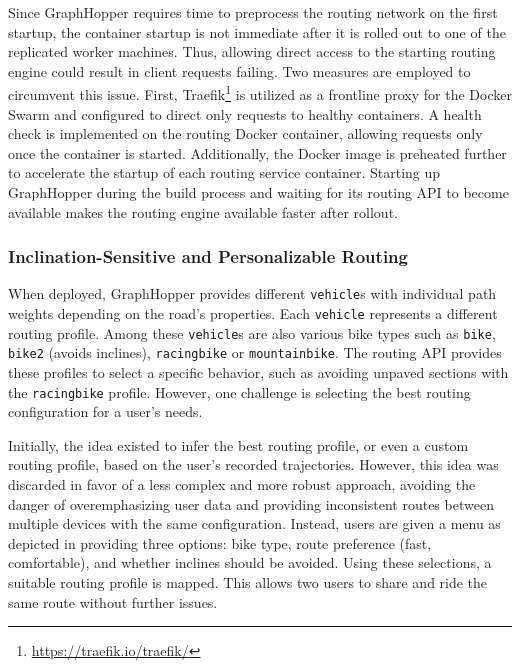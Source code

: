 Since GraphHopper requires time to preprocess the routing network on the first startup, the container startup is not immediate after it is rolled out to one of the replicated worker machines. Thus, allowing direct access to the starting routing engine could result in client requests failing. Two measures are employed to circumvent this issue. First, Traefik\footnote{\url{https://traefik.io/traefik/}} is utilized as a frontline proxy for the Docker Swarm and configured to direct only requests to healthy containers. A health check is implemented on the routing Docker container, allowing requests only once the container is started. Additionally, the Docker image is preheated further to accelerate the startup of each routing service container. Starting up GraphHopper during the build process and waiting for its routing API to become available makes the routing engine available faster after rollout. 

\subsubsection{Inclination-Sensitive and Personalizable Routing}\label{sec:maxlorenz3}

When deployed, GraphHopper provides different \texttt{vehicle}s with individual path weights depending on the road's properties. Each \texttt{vehicle} represents a different routing profile. Among these \texttt{vehicle}s are also various bike types such as \texttt{bike}, \texttt{bike2} (avoids inclines), \texttt{racingbike} or \texttt{mountainbike}. The routing API provides these profiles to select a specific behavior, such as avoiding unpaved sections with the \texttt{racingbike} profile. However, one challenge is selecting the best routing configuration for a user's needs. 

Initially, the idea existed to infer the best routing profile, or even a custom routing profile, based on the user's recorded trajectories. However, this idea was discarded in favor of a less complex and more robust approach, avoiding the danger of overemphasizing user data and providing inconsistent routes between multiple devices with the same configuration. Instead, users are given a menu as depicted in  providing three options: bike type, route preference (fast, comfortable), and whether inclines should be avoided. Using these selections, a suitable routing profile is mapped. This allows two users to share and ride the same route without further issues.

